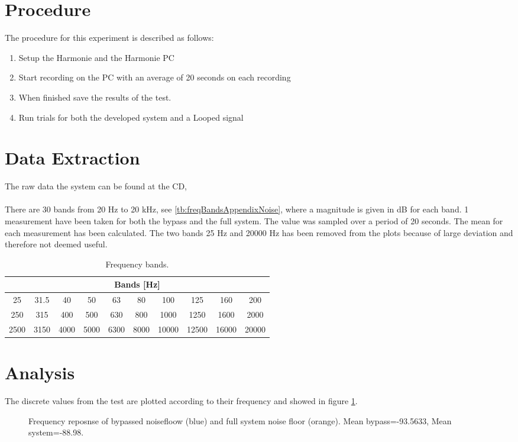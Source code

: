 \section{Procedure}
The procedure for this experiment is described as follows:
\vspace{-5mm}
\begin{enumerate}
\item Setup the Harmonie and the Harmonie PC
\item Start recording on the PC with an average of 20 seconds on each recording
\item When finished save the results of the test.
\item Run trials for both the developed system and a Looped signal
\end{enumerate}

\section{Data Extraction}
The raw data the system can be found at the CD, \\
 \\
There are 30 bands from 20 Hz to 20 kHz, see \autoref{tb:freqBandsAppendixNoise}, where a magnitude is given in dB for each band. 1 measurement have been taken for both the bypass and the full system. The value was sampled over a period of 20 seconds. The mean for each measurement has been calculated. The two bands 25 Hz and 20000 Hz has been removed from the plots because of large deviation and therefore not deemed useful. 

\begin{table}[H]
\centering
\begin{tabular}{|c|c|c|c|c|c|c|c|c|c|}
\hline
\multicolumn{10}{|c|}{Bands [Hz]}                                       \\ \hline
25   & 31.5 & 40   & 50   & 63   & 80   & 100   & 125   & 160   & 200   \\ \hline
250  & 315  & 400  & 500  & 630  & 800  & 1000  & 1250  & 1600  & 2000  \\ \hline
2500 & 3150 & 4000 & 5000 & 6300 & 8000 & 10000 & 12500 & 16000 & 20000 \\ \hline
\end{tabular}
\caption{Frequency bands.}
\label{tb:freqBandsAppendixNoise}
\end{table}

\section{Analysis}
The discrete values from the test are plotted according to their frequency and showed in figure \ref{fig:FFreqNoiseComp}.
\begin{figure}[H]
	\centering
	
	\caption{Frequency reposnse of bypassed noisefloow (blue) and full system noise floor (orange). Mean bypass=-93.5633, Mean system=-88.98.}
	\label{fig:FFreqNoiseComp}
\end{figure}

